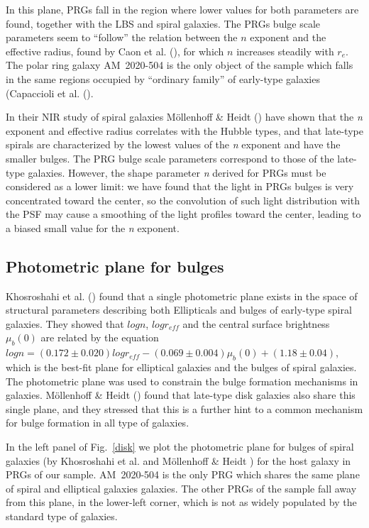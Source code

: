 \documentclass{aa}
\begin{document}
In this plane, PRGs fall in the region where lower values for both
parameters are found, together with the LBS and spiral galaxies.
The PRGs bulge scale parameters seem to ``follow'' the relation between
the $n$ exponent and the effective radius, found by Caon et al. 
(\cite{Caon93}), for which $n$ increases steadily with  $r_{e}$. 
The polar ring galaxy AM~2020-504 is the only object of the sample which
falls  in the same regions occupied by ``ordinary family''
of early-type galaxies (Capaccioli et al. (\cite{Cap92}).

In their NIR study of spiral galaxies M\"{o}llenhoff \& Heidt 
(\cite{mollenhoff2001}) have shown that the {\it n} exponent and effective 
radius
correlates with the Hubble types, and that late-type spirals are 
characterized by the lowest values of the {\it n} exponent and have the 
smaller bulges. The PRG bulge scale parameters correspond to those of the 
late-type galaxies.
However, the shape parameter {\it n} derived for PRGs must be considered 
as a lower limit: we have found
that the light in PRGs bulges is very concentrated toward the center, so
the convolution of such light distribution  with the PSF may cause a
smoothing of the light profiles toward the center, leading to a biased
small value for the {\it n} exponent.

\subsection{Photometric plane for bulges}
Khosroshahi et al. (\cite{khos2000a}) found that a single photometric plane
exists in the space of structural parameters describing both Ellipticals and 
bulges of early-type spiral galaxies. 
They showed that $log n$, $log r_{eff}$ and the central surface brightness
$\mu _b(0)$ are related by the equation 
$log n=(0.172 \pm 0.020)log r_{eff} -(0.069 \pm 0.004)\mu_ b(0)+(1.18 \pm 0.04)$,
which is the best-fit plane for elliptical galaxies and the bulges of spiral 
galaxies. The photometric plane was used to constrain the bulge 
formation mechanisms in galaxies.
M\"{o}llenhoff \& Heidt (\cite{mollenhoff2001}) found that 
late-type disk galaxies also share this single plane, and they stressed that
this is a further hint to a common mechanism for bulge formation in all type 
of galaxies. 

In the left panel of  Fig.~\ref{disk} we plot the photometric plane for
bulges of spiral galaxies (by Khosroshahi et al. \cite{khos2000b} and 
M\"{o}llenhoff \& Heidt \cite{mollenhoff2001}) for the host galaxy in PRGs
of our sample. AM~2020-504 is the only PRG which shares the same plane of
spiral and elliptical galaxies galaxies. The other PRGs of the sample fall
away from this plane, in the lower-left corner, which is not as widely populated 
by the standard type of galaxies.
\end{document}
